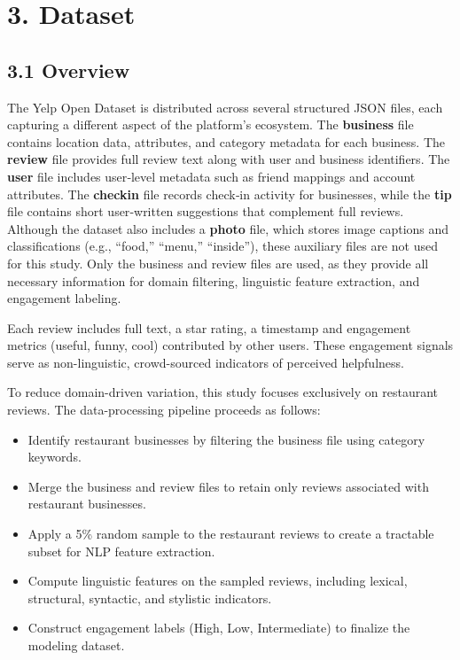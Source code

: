 \hypertarget{dataset}{%
\section{3. Dataset}\label{dataset}}

\hypertarget{overview}{%
\subsection{3.1 Overview}\label{overview}}

The Yelp Open Dataset is distributed across several structured JSON
files, each capturing a different aspect of the platform's ecosystem.
The \textbf{business} file contains location data, attributes, and
category metadata for each business. The \textbf{review} file provides
full review text along with user and business identifiers. The
\textbf{user} file includes user‑level metadata such as friend mappings
and account attributes. The \textbf{checkin} file records check‑in
activity for businesses, while the \textbf{tip} file contains short
user‑written suggestions that complement full reviews. Although the
dataset also includes a \textbf{photo} file, which stores image captions
and classifications (e.g., ``food,'' ``menu,'' ``inside''), these
auxiliary files are not used for this study. Only the business and
review files are used, as they provide all necessary information for
domain filtering, linguistic feature extraction, and engagement
labeling.

Each review includes full text, a star rating, a timestamp and
engagement metrics (useful, funny, cool) contributed by other users.
These engagement signals serve as non-linguistic, crowd-sourced
indicators of perceived helpfulness.

To reduce domain-driven variation, this study focuses exclusively on
restaurant reviews. The data-processing pipeline proceeds as follows:

\begin{itemize}  

\item Identify restaurant businesses by filtering the business file using category keywords.
\item Merge the business and review files to retain only reviews associated with restaurant businesses.
\item Apply a 5\% random sample to the restaurant reviews to create a tractable subset for NLP feature extraction.
\item Compute linguistic features on the sampled reviews, including lexical, structural, syntactic, and stylistic indicators.
\item Construct engagement labels (High, Low, Intermediate) to finalize the modeling dataset.

\end{itemize}

